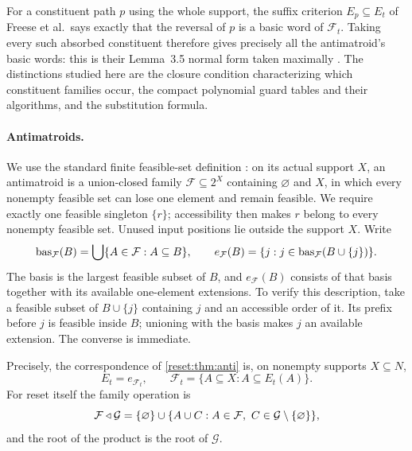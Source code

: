 \begin{remark}
\label{reset:rem:priority}
For a constituent path $p$ using the whole support, the suffix criterion $E_p\subseteq E_t$ of Freese et al.\ says exactly that the reversal of $p$ is a basic word of $\mathcal F_t$. Taking every such absorbed constituent therefore gives precisely all the antimatroid's basic words: this is their
Lemma~3.5 normal form taken maximally \cite{FreeseEtAl2002}. The distinctions studied here are the closure condition characterizing which constituent families occur, the compact polynomial guard tables and their algorithms, and the substitution formula.
\end{remark}

\paragraph{Antimatroids.}
We use the standard finite feasible-set definition \cite[Section~7]{Czedli2014}: on its actual support $X$, an antimatroid is a union-closed family $\mathcal F\subseteq2^X$ containing $\varnothing$ and $X$, in which every nonempty feasible set can lose one element and remain feasible. We require exactly one feasible singleton $\{r\}$; accessibility then makes $r$ belong to every nonempty feasible set. Unused input positions lie outside the support $X$. Write
\[
 \operatorname{bas}_{\mathcal F}(B)=\bigcup\{A\in\mathcal F:A\subseteq B\},\qquad
 e_{\mathcal F}(B)=\{j:j\in\operatorname{bas}_{\mathcal F}(B\cup\{j\})\}.
\]
The basis is the largest feasible subset of $B$, and $e_{\mathcal F}(B)$ consists of that basis together with its available one-element extensions. To verify this description, take a feasible subset of $B\cup\{j\}$ containing $j$ and an accessible order of it. Its prefix before $j$ is feasible inside $B$;
unioning with the basis makes $j$ an available extension. The converse is immediate.

Precisely, the correspondence of \cref{reset:thm:anti} is, on nonempty supports $X\subseteq N$,
\[
 E_t=e_{\mathcal F_t},\qquad
 \mathcal F_t=\{A\subseteq X:A\subseteq E_t(A)\}.
\]
For reset itself the family operation is
\begin{equation}\label{reset:eq:family-product}
 \mathcal F\mathbin{\triangleleft}\mathcal G=
 \{\varnothing\}\cup
 \{A\cup C:A\in\mathcal F,\ C\in\mathcal G\setminus\{\varnothing\}\},
\end{equation}
and the root of the product is the root of $\mathcal G$.

